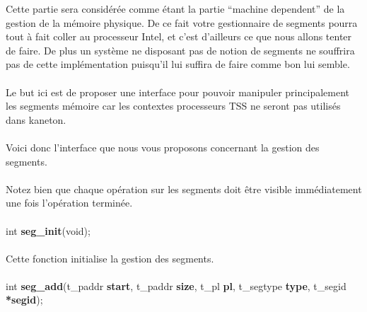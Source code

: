 \documentclass[10pt,a4wide]{article}
\begin{document}
Cette partie sera consid\'er\'ee comme \'etant la partie ``machine
dependent'' de la gestion de la m\'emoire physique. De ce fait votre
gestionnaire de segments pourra tout \`a fait coller au processeur
Intel, et c'est d'ailleurs ce que nous allons tenter de faire.
De plus un syst\`eme ne disposant pas de notion de segments ne souffrira
pas de cette impl\'ementation puisqu'il lui suffira de faire comme bon
lui semble.

\paragraph{}

Le but ici est de proposer une interface pour pouvoir manipuler principalement
les segments m\'emoire car les contextes processeurs TSS ne seront pas
utilis\'es dans kaneton.

\paragraph{}

Voici donc l'interface que nous vous proposons concernant la
gestion des segments.

\paragraph{}

Notez bien que chaque op\'eration sur les segments doit \^etre
visible imm\'ediatement une fois l'op\'eration termin\'ee.

\paragraph{}

\hspace{1.5cm}int \textbf{seg\_init}(void);

\paragraph{}

Cette fonction initialise la gestion des segments.

\paragraph{}

\hspace{1.5cm}int \textbf{seg\_add}(t\_paddr \textbf{start},
                                    t\_paddr \textbf{size},
                                    t\_pl \textbf{pl},
                                    t\_segtype \textbf{type},
                                    t\_segid \textbf{*segid});
\end{document}

